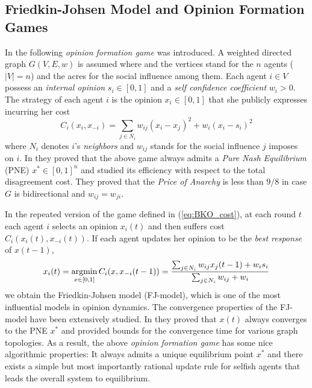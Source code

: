 

\subsection{Friedkin-Johsen Model and Opinion Formation Games}
In \cite{BKO11} the following \emph{opinion formation game} was introduced.
A weighted directed graph $G(V,E,w)$ is assumed where and the vertices
stand for the $n$ agents ($|V| = n$) and the acres for the social
influence among them. Each agent $i \in V$ possess an
\emph{internal opinion} $s_i \in [0,1]$ and a \emph{self confidence coefficient}
$w_i>0$. The strategy of each agent $i$ is the opinion $x_i\in [0,1]$ that
she publicly expresses incurring her cost
%
\begin{equation}\label{eq:BKO_cost}
  C_i(x_i,x_{-i}) = \sum_{j \in N_i}w_{ij}(x_i-x_j)^2 + w_i(x_i -s_i)^2
\end{equation}
%
where $N_i$ denotes $i$'s \emph{neighbors} and $w_{ij}$ stands for
the social influence $j$ imposes on $i$. In \cite{BKO11} they proved that
the above game always admits a \emph{Pure Nash Equilibrium} (PNE) $x^* \in [0,1]^n$
and studied its efficiency with respect to the total disagreement cost.
They proved that the \emph{Price of Anarchy}
is less than $9/8$ in case $G$ is bidirectional and $w_{ij}=w_{ji}$.

In the repeated version of the game defined in (\ref{eq:BKO_cost}),
at each round $t$ each agent $i$ selects an opinion $x_i(t)$ and then suffers
cost $C_i(x_i(t),x_{-i}(t))$. If each agent updates her opinion to be the
\emph{best response} of $x(t-1)$,
%
\begin{equation}\label{eq:FJ_model}
  x_i(t) =
  \operatorname*{argmin}_{x \in [0,1]}C_i(x,x_{-i}(t-1))=
  \frac{\sum_{j \in N_i}w_{ij}x_j(t-1) + w_is_i}{\sum_{j \in N_i}w_{ij} + w_i}
\end{equation}
%
we obtain the Friedkin-Johsen model (FJ-model), which is one of
the most influential models in opinion dynamics.
The convergence properties of the FJ-model have been extensively studied.
In \cite{GS14} they proved that $x(t)$ always converges
to the PNE $x^*$ and provided bounds for the convergence time for various
graph topologies. As a result, the
above \emph{opinion formation game} has some nice algorithmic properties: It
always admits a unique equilibrium point $x^*$ and there
exists a simple but most importantly rational update rule for selfish agents
that leads the overall system to equilibrium.

